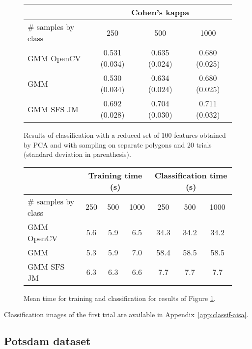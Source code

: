 \documentclass[a4paper,11pt,DIV=16,abstracton]{scrartcl}
\begin{document}
    \begin{figure}[!ht]
        \centering
        \begin{tabular}{|l|c|c|c|}\hline
             & \multicolumn{3}{c|}{\bfseries Cohen's kappa} \\ \hline
            \# samples by class & 250 & 500 & 1000 \\ \hline

            GMM OpenCV & 0.531 (0.034) & 0.635 (0.024) & 0.680 (0.025) \\
            GMM        & 0.530 (0.034) & 0.634 (0.024) & 0.680 (0.025) \\
            GMM SFS JM & 0.692 (0.028) & 0.704 (0.030) & 0.711 (0.032) \\

            \hline
        \end{tabular}
        \caption{Results of classification with a reduced set of 100 features obtained by PCA and with sampling on separate polygons and 20 trials (standard deviation in parenthesis).\label{tab:aisa-otbsimu-reduced}}
    \end{figure}

    \begin{figure}[!ht]
        \centering
        \begin{tabular}{|l|c|c|c|c|c|c|}\hline
             & \multicolumn{3}{c|}{\bfseries Training time (s)} & \multicolumn{3}{c|}{\bfseries Classification time (s)} \\ \hline
            \# samples by class & 250 & 500 & 1000 & 250 & 500 & 1000 \\ \hline

            GMM OpenCV & 5.6 & 5.9 & 6.5 & 34.3 & 34.2 & 34.2 \\
            GMM        & 5.3 & 5.9 & 7.0 & 58.4 & 58.5 & 58.5 \\
            GMM SFS JM & 6.3 & 6.3 & 6.6 & 7.7  & 7.7  & 7.7 \\

            \hline
        \end{tabular}
        \caption{Mean time for training and classification for results of Figure \ref{tab:aisa-otbsimu-reduced}.\label{tab:aisa-otbsimu-time-reduced}}
    \end{figure}

    Classification images of the first trial are available in Appendix~\ref{app:classif-aisa}.

    \subsection{Potsdam dataset}
\end{document}
